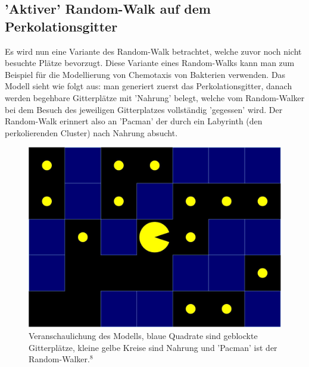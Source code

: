 \documentclass[a4paper, 12pt]{scrartcl}
\begin{document}
\subsection{'Aktiver' Random-Walk auf dem Perkolationsgitter}
Es wird nun eine Variante des Random-Walk betrachtet, welche zuvor noch nicht besuchte Plätze bevorzugt. Diese Variante eines Random-Walks kann man zum Beispiel für die Modellierung von Chemotaxis von Bakterien verwenden. Das Modell sieht wie folgt aus: man generiert zuerst das Perkolationsgitter, danach werden begehbare Gitterplätze mit 'Nahrung' belegt, welche vom Random-Walker bei dem Besuch des jeweiligen Gitterplatzes vollständig 'gegessen' wird. Der Random-Walk erinnert also an 'Pacman' der durch ein Labyrinth (den perkolierenden Cluster) nach Nahrung absucht.
\begin{figure}[h!]
	\centering
	\includegraphics[scale=0.25]{pacman.png}
	\caption{Veranschaulichung des Modells, blaue Quadrate sind geblockte Gitterplätze, kleine gelbe Kreise sind Nahrung und 'Pacman' ist der Random-Walker.$^8$}
\end{figure}
\newpage
\end{document}
